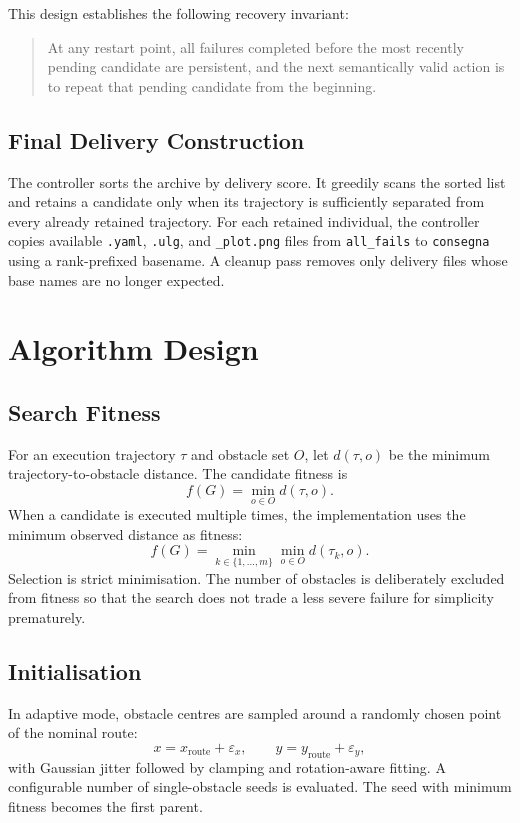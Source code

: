 \documentclass[11pt,a4paper]{report}
\newcommand{\code}[1]{\texttt{#1}}
\begin{document}
This design establishes the following recovery invariant:
\begin{quote}
At any restart point, all failures completed before the most recently pending candidate are persistent, and the next semantically valid action is to repeat that pending candidate from the beginning.
\end{quote}

\subsection{Final Delivery Construction}
The controller sorts the archive by delivery score. It greedily scans the sorted list and retains a candidate only when its trajectory is sufficiently separated from every already retained trajectory. For each retained individual, the controller copies available \code{.yaml}, \code{.ulg}, and \code{\_plot.png} files from \code{all\_fails} to \code{consegna} using a rank-prefixed basename. A cleanup pass removes only delivery files whose base names are no longer expected.

\section{Algorithm Design}

\subsection{Search Fitness}
For an execution trajectory $\tau$ and obstacle set $O$, let $d(\tau,o)$ be the minimum trajectory-to-obstacle distance. The candidate fitness is
\[
f(G)=\min_{o\in O} d(\tau,o).
\]
When a candidate is executed multiple times, the implementation uses the minimum observed distance as fitness:
\[
f(G)=\min_{k\in\{1,\ldots,m\}}\min_{o\in O}d(\tau_k,o).
\]
Selection is strict minimisation. The number of obstacles is deliberately excluded from fitness so that the search does not trade a less severe failure for simplicity prematurely.

\subsection{Initialisation}
In adaptive mode, obstacle centres are sampled around a randomly chosen point of the nominal route:
\[
x=x_{\mathrm{route}}+\varepsilon_x,\qquad
 y=y_{\mathrm{route}}+\varepsilon_y,
\]
with Gaussian jitter followed by clamping and rotation-aware fitting. A configurable number of single-obstacle seeds is evaluated. The seed with minimum fitness becomes the first parent.
\end{document}
